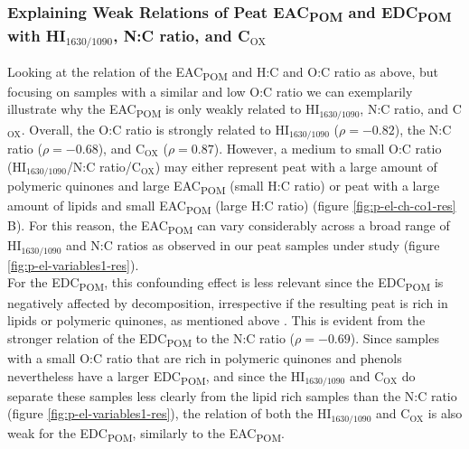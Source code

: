\documentclass[alpha-refs, lineno]{wiley-article-rmd}
\begin{document}
\hypertarget{explaining-weak-relations-of-peat-eac-and-edc-with-hi_text16301090-nc-ratio-and-c_textox}{%
\subsubsection{\texorpdfstring{Explaining Weak Relations of Peat EAC\textsubscript{POM} and EDC\textsubscript{POM} with HI\(_\text{1630/1090}\), N:C ratio, and C\(_\text{OX}\)}{Explaining Weak Relations of Peat EAC and EDC with HI\_\textbackslash text\{1630/1090\}, N:C ratio, and C\_\textbackslash text\{OX\}}}\label{explaining-weak-relations-of-peat-eac-and-edc-with-hi_text16301090-nc-ratio-and-c_textox}}

Looking at the relation of the EAC\textsubscript{POM} and H:C and O:C ratio as above, but focusing on samples with a similar and low O:C ratio we can exemplarily illustrate why the EAC\textsubscript{POM} is only weakly related to HI\(_\text{1630/1090}\), N:C ratio, and C\(_\text{OX}\). Overall, the O:C ratio is strongly related to HI\(_\text{1630/1090}\) (\(\rho=-0.82\)), the N:C ratio (\(\rho=-0.68\)), and C\(_\text{OX}\) (\(\rho=0.87\)). However, a medium to small O:C ratio (HI\(_\text{1630/1090}\)/N:C ratio/C\(_\text{OX}\)) may either represent peat with a large amount of polymeric quinones and large EAC\textsubscript{POM} (small H:C ratio) or peat with a large amount of lipids and small EAC\textsubscript{POM} (large H:C ratio) (figure \ref{fig:p-el-ch-co1-res} B). For this reason, the EAC\textsubscript{POM} can vary considerably across a broad range of HI\(_\text{1630/1090}\) and N:C ratios as observed in our peat samples under study (figure \ref{fig:p-el-variables1-res}).\\
For the EDC\textsubscript{POM}, this confounding effect is less relevant since the EDC\textsubscript{POM} is negatively affected by decomposition, irrespective if the resulting peat is rich in lipids or polymeric quinones, as mentioned above \autocite{Fenner.2011,Bolton.2018}. This is evident from the stronger relation of the EDC\textsubscript{POM} to the N:C ratio (\(\rho=-0.69\)). Since samples with a small O:C ratio that are rich in polymeric quinones and phenols nevertheless have a larger EDC\textsubscript{POM}, and since the HI\(_\text{1630/1090}\) and C\(_\text{OX}\) do separate these samples less clearly from the lipid rich samples than the N:C ratio (figure \ref{fig:p-el-variables1-res}), the relation of both the HI\(_\text{1630/1090}\) and C\(_\text{OX}\) is also weak for the EDC\textsubscript{POM}, similarly to the EAC\textsubscript{POM}.
\end{document}
